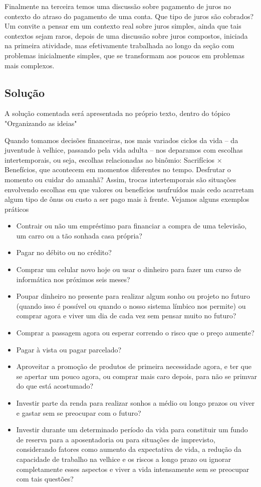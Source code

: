 \begin{texto}
{Finalmente na terceira temos uma discussão sobre pagamento de juros no contexto do atraso do pagamento de uma conta. Que tipo de juros são cobrados? Um convite a pensar em um contexto real sobre juros simples, ainda que tais contextos sejam raros, depois de uma discussão sobre juros compostos, iniciada na primeira atividade, mas efetivamente trabalhada ao longo da seção com problemas inicialmente simples, que se transformam aos poucos em problemas mais complexos.

\subsection{Solução}
A solução comentada será apresentada no próprio texto, dentro do tópico "Organizando as ideias"
}
\end{texto}
\label{fin-exp-3}
Quando tomamos decisões financeiras, nos mais variados ciclos da vida – da juventude à velhice, passando pela vida adulta – nos deparamos com escolhas intertemporais, ou seja, escolhas relacionadas ao binômio: Sacrifícios $\times$ Benefícios, que acontecem em momentos diferentes no tempo. Desfrutar o momento ou cuidar do amanhã? Assim, trocas intertemporais \citep{fonseca2005} são situações envolvendo escolhas em que valores ou benefícios usufruídos mais cedo acarretam algum tipo de ônus ou custo a ser pago mais à frente. Vejamos alguns exemplos práticos

\begin{itemize}
  \item Contrair ou não um empréstimo para financiar a compra de uma televisão, um carro ou a tão sonhada casa própria?
  \item Pagar no débito ou no crédito?
  \item Comprar um celular novo hoje ou usar o dinheiro para fazer um curso de informática nos próximos seis meses?
  \item Poupar dinheiro no presente para realizar algum sonho ou projeto no futuro (quando isso é possível ou quando o nosso sistema límbico nos permite) ou comprar agora e viver um dia de cada vez sem pensar muito no futuro?
  \item Comprar a passagem agora ou esperar correndo o risco que o preço aumente?
  \item Pagar à vista ou pagar parcelado?
  \item Aproveitar a promoção de produtos de primeira necessidade agora, e ter que se apertar um pouco agora, ou comprar mais caro depois, para não se primvar do que está acostumado?
  \item Investir parte da renda para realizar sonhos a médio ou longo prazos ou viver e gastar sem se preocupar com o futuro?
  \item Investir durante um determinado período da vida para constituir um fundo de reserva para a aposentadoria ou para situações de imprevisto, considerando fatores como aumento da expectativa de vida, a redução da capacidade de trabalho na velhice e os riscos a longo prazo ou ignorar completamente esses aspectos e viver a vida intensamente sem se preocupar com tais questões?
\end{itemize}

